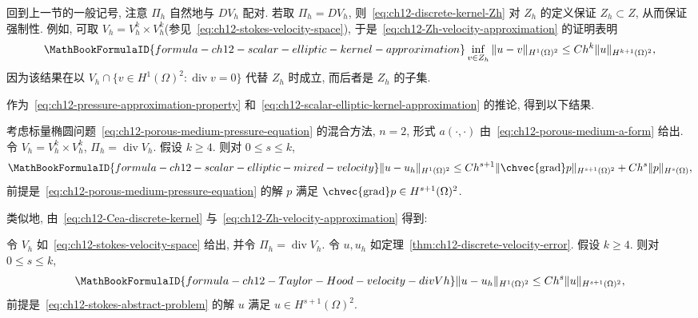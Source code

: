 回到上一节的一般记号, 注意 $\Pi_h$ 自然地与 $DV_h$ 配对. 若取 $\Pi_h=DV_h$, 则~\eqref{eq:ch12-discrete-kernel-Zh} 对 $Z_h$ 的定义保证 $Z_h\subset Z$, 从而保证强制性. 例如, 可取 $V_h=V_h^k\times V_h^k$(参见~\eqref{eq:ch12-stokes-velocity-space}), 于是~\eqref{eq:ch12-Zh-velocity-approximation} 的证明表明
\begin{equation}
\MathBookFormulaID{formula-ch12-scalar-elliptic-kernel-approximation}
\label{eq:ch12-scalar-elliptic-kernel-approximation}
\inf_{v\in Z_h}\|u-v\|_{H^1(\Omega)^2}
\leq Ch^k\|u\|_{H^{k+1}(\Omega)^2},
\end{equation}
因为该结果在以 $V_h\cap\{v\in H^1(\Omega)^2:\operatorname{div}v=0\}$ 代替 $Z_h$ 时成立, 而后者是 $Z_h$ 的子集.

作为~\eqref{eq:ch12-pressure-approximation-property} 和~\eqref{eq:ch12-scalar-elliptic-kernel-approximation} 的推论, 得到以下结果.

\begin{Theorem}
\label{thm:ch12-scalar-elliptic-mixed-velocity}
考虑标量椭圆问题~\eqref{eq:ch12-porous-medium-pressure-equation} 的混合方法, $n=2$, 形式 $a(\cdot,\cdot)$ 由~\eqref{eq:ch12-porous-medium-a-form} 给出. 令 $V_h=V_h^k\times V_h^k$, $\Pi_h=\operatorname{div}V_h$. 假设 $k\geq4$. 则对 $0\leq s\leq k$,
\[
\MathBookFormulaID{formula-ch12-scalar-elliptic-mixed-velocity}
\|u-u_h\|_{H^1(\Omega)^2}
\leq Ch^{s+1}\|\chvec{\operatorname{grad}}p\|_{H^{s+1}(\Omega)^2}
+Ch^s\|p\|_{H^s(\Omega)},
\]
前提是~\eqref{eq:ch12-porous-medium-pressure-equation} 的解 $p$ 满足
$\chvec{\operatorname{grad}}p\in H^{s+1}(\Omega)^2$.
\end{Theorem}

类似地, 由~\eqref{eq:ch12-Cea-discrete-kernel} 与~\eqref{eq:ch12-Zh-velocity-approximation} 得到:

\begin{Theorem}
\label{thm:ch12-Taylor-Hood-velocity-divVh}
令 $V_h$ 如~\eqref{eq:ch12-stokes-velocity-space} 给出, 并令 $\Pi_h=\operatorname{div}V_h$. 令 $u,u_h$ 如定理~\ref{thm:ch12-discrete-velocity-error}. 假设 $k\geq4$. 则对 $0\leq s\leq k$,
\[
\MathBookFormulaID{formula-ch12-Taylor-Hood-velocity-divVh}
\|u-u_h\|_{H^1(\Omega)^2}
\leq Ch^s\|u\|_{H^{s+1}(\Omega)^2},
\]
前提是~\eqref{eq:ch12-stokes-abstract-problem} 的解 $u$ 满足
$u\in H^{s+1}(\Omega)^2$.
\end{Theorem}

